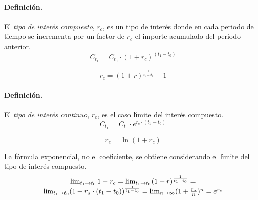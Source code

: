 \paragraph{Definici\'on.}
El \emph{tipo de inter\'es compuesto}, $r_c$, es un tipo
de inter\'es donde en cada periodo de tiempo se incrementa por un factor de $r_c$ el importe
acumulado del periodo anterior.
\begin{equation}
C_{t_1} = C_{t_0} \cdot (1+ r_c)^{(t_1-t_0)}
\end{equation}

\begin{equation}
\label{interes_compuesto_1}
r_c = (1 + r) ^ \frac{1}{t_1-t_0} - 1
\end{equation}

\paragraph{Definici\'on.}
El \emph{tipo de inter\'es continuo}, $r_e$, es el caso
l\'\i mite del inter\'es compuesto.
\begin{equation}
C_{t_1} = C_{t_0} \cdot e^{r_e \cdot (t_1-t_0)}
\end{equation}

\begin{equation}
\label{interes_continuo_1}
r_e = \ln(1 + r_c)
\end{equation}

La f\'ormula exponencial, no el coeficiente, se obtiene considerando el
l\'\i mite del tipo de inter\'es compuesto.
\begin{equation}
\label{interes_continuo_2}
\begin{array}{c}
\lim_{t_1 \rightarrow t_0} 1+r_c = 
\lim_{t_1 \rightarrow t_0} (1 + r)^{\frac{1}{t_1 - t_0}} = \cr
\lim_{t_1 \rightarrow t_0} (1 + r_s \cdot (t_1-t_0)) ^ {\frac{1}{t_1 - t_0}} =
\lim_{n \rightarrow \infty} (1 + \frac{r_s}{n}) ^ {n} = 
e^{r_s}
\end{array}
\end{equation}

